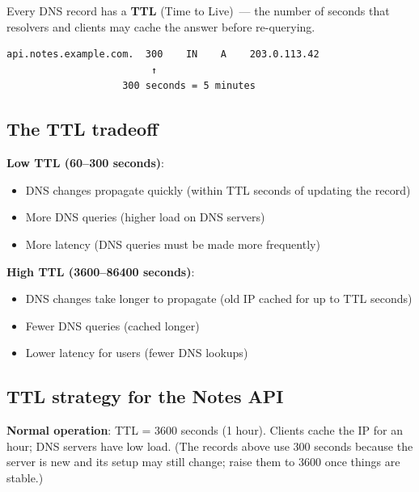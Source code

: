 Every DNS record has a \textbf{TTL} (Time to Live)~--- the number of seconds that resolvers and clients may cache the answer before re-querying.

\begin{outputbox}[short]
\begin{Verbatim}[fontsize=\codesize, breaklines, breakanywhere, breaksymbolleft={\tiny\textcolor{muted}{$\hookrightarrow$}}]
api.notes.example.com.  300    IN    A    203.0.113.42
                         ↑
                    300 seconds = 5 minutes
\end{Verbatim}
\end{outputbox}

\subsection*{The TTL tradeoff}\label{27-domain-and-dns:the-ttl-tradeoff}

\textbf{Low TTL (60--300 seconds)}:

\begin{itemize}
\tightlist
\item
  DNS changes propagate quickly (within TTL seconds of updating the record)
\item
  More DNS queries (higher load on DNS servers)
\item
  More latency (DNS queries must be made more frequently)
\end{itemize}

\noindent{}\textbf{High TTL (3600--86400 seconds)}:

\begin{itemize}
\tightlist
\item
  DNS changes take longer to propagate (old IP cached for up to TTL seconds)
\item
  Fewer DNS queries (cached longer)
\item
  Lower latency for users (fewer DNS lookups)
\end{itemize}

\subsection*{TTL strategy for the Notes API}\label{27-domain-and-dns:ttl-strategy-for-the-notes-api}

\textbf{Normal operation}: TTL = 3600 seconds (1 hour). Clients cache the IP for an hour; DNS servers have low load. (The records above use 300 seconds because the server is new and its setup may still change; raise them to 3600 once things are stable.)

